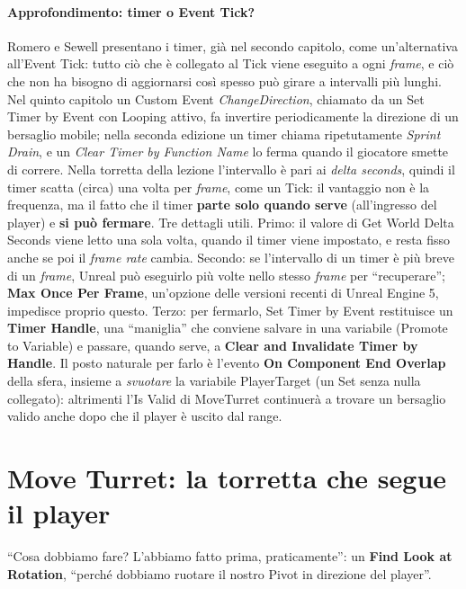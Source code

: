 \paragraph{Approfondimento: timer o Event Tick?} Romero e Sewell presentano i timer, già
nel secondo capitolo, come un'alternativa all'Event Tick: tutto ciò che è collegato al
Tick viene eseguito a ogni \emph{frame}, e ciò che non ha bisogno di aggiornarsi così
spesso può girare a intervalli più lunghi. Nel quinto capitolo un Custom Event
\emph{ChangeDirection}, chiamato da un Set Timer by Event con Looping attivo, fa
invertire periodicamente la direzione di un bersaglio mobile; nella seconda edizione un
timer chiama ripetutamente \emph{Sprint Drain}, e un \emph{Clear Timer by Function Name}
lo ferma quando il giocatore smette di correre. Nella torretta della lezione l'intervallo
è pari ai \emph{delta seconds}, quindi il timer scatta (circa) una volta per
\emph{frame}, come un Tick: il vantaggio non è la frequenza, ma il fatto che il timer
\textbf{parte solo quando serve} (all'ingresso del player) e \textbf{si può fermare}.
Tre dettagli utili. Primo: il valore di Get World Delta Seconds viene letto una sola
volta, quando il timer viene impostato, e resta fisso anche se poi il \emph{frame rate}
cambia. Secondo: se l'intervallo di un timer è più breve di un \emph{frame}, Unreal può
eseguirlo più volte nello stesso \emph{frame} per ``recuperare''; \textbf{Max Once Per
Frame}, un'opzione delle versioni recenti di Unreal Engine 5, impedisce proprio questo.
Terzo: per fermarlo, Set Timer by Event restituisce un \textbf{Timer Handle}, una
``maniglia'' che conviene salvare in una variabile (Promote to Variable) e passare,
quando serve, a \textbf{Clear and Invalidate Timer by Handle}. Il posto naturale per
farlo è l'evento \textbf{On Component End Overlap} della sfera, insieme a
\emph{svuotare} la variabile PlayerTarget (un Set senza nulla collegato): altrimenti
l'Is Valid di MoveTurret continuerà a trovare un bersaglio valido anche dopo che il
player è uscito dal range.

\section{Move Turret: la torretta che segue il player}
\label{ue4:sec:move}

``Cosa dobbiamo fare? L'abbiamo fatto prima, praticamente'': un \textbf{Find Look at
Rotation}, ``perché dobbiamo ruotare il nostro Pivot in direzione del player''.

